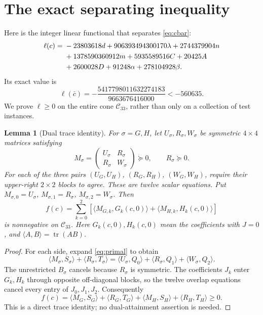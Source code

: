 \documentclass[10pt]{article}
\newtheorem{lemma}[theorem]{Lemma}
\newcommand{\R}{\mathbb R}
\newcommand{\Cq}{\mathcal C_{33}}
\newcommand{\ip}[2]{\langle #1,#2\rangle}
\newcommand{\tr}{\operatorname{tr}}
\begin{document}
\section{The exact separating inequality}
Here is the integer linear functional that separates \eqref{eq:cbar}:
\begin{align}
\ell(c)={}&-23803618d+906393494300170\lambda+2744379904n\notag\\
 &+1378590360912m+5935589516C+20425A\notag\\
 &+2600028D+91248\alpha+278104928\beta.                    \label{eq:ell}
\end{align}
Its exact value is
\begin{equation}
\boxed{\ell(\bar c)=-\frac{5417798011632274183}{9663676416000}
                    <-560635.}                            \label{eq:negative}
\end{equation}
We prove $\ell\geq0$ on the entire cone $\Cq$, rather than only on a
collection of test instances.

\begin{lemma}[Dual trace identity]\label{lem:dual}
For $\sigma=G,H$, let $U_\sigma,R_\sigma,W_\sigma$ be symmetric $4\times4$
matrices satisfying
\begin{equation}
M_\sigma=\begin{pmatrix}U_\sigma&R_\sigma\\R_\sigma&W_\sigma\end{pmatrix}
\succeq0,\qquad R_\sigma\succeq0.                         \label{eq:dualPSD}
\end{equation}
For each of the three pairs $(U_G,U_H)$, $(R_G,R_H)$, $(W_G,W_H)$, require
their upper-right $2\times2$ blocks to agree. These are twelve scalar
equations. Put $M_{\sigma,0}=U_\sigma$, $M_{\sigma,1}=R_\sigma$,
$M_{\sigma,2}=W_\sigma$. Then
\begin{equation}
f(c)=\sum_{k=0}^2\left[\ip{M_{G,k}}{G_k(c,0)}
                         +\ip{M_{H,k}}{H_k(c,0)}\right]    \label{eq:f}
\end{equation}
is nonnegative on $\Cq$. Here $G_k(c,0),H_k(c,0)$ mean the coefficients
with $J=0$, and $\ip AB=\tr(AB)$.
\end{lemma}
\begin{proof}
For each side, expand \eqref{eq:primal} to obtain
\[
\ip{M_\sigma}{S_\sigma}+\ip{R_\sigma}{T_\sigma}
=\ip{U_\sigma}{Q_0}+\ip{R_\sigma}{Q_1}+\ip{W_\sigma}{Q_2}.
\]
The unrestricted $B_\sigma$ cancels because $R_\sigma$ is symmetric.
The coefficients $J_k$ enter $G_k,H_k$ through opposite off-diagonal blocks,
so the twelve overlap equations cancel every entry of $J_0,J_1,J_2$.
Consequently
\begin{equation}
f(c)=\ip{M_G}{S_G}+\ip{R_G}{T_G}
     +\ip{M_H}{S_H}+\ip{R_H}{T_H}\geq0.                  \label{eq:pairing}
\end{equation}
This is a direct trace identity; no dual-attainment assertion is needed.
\end{proof}
\end{document}
